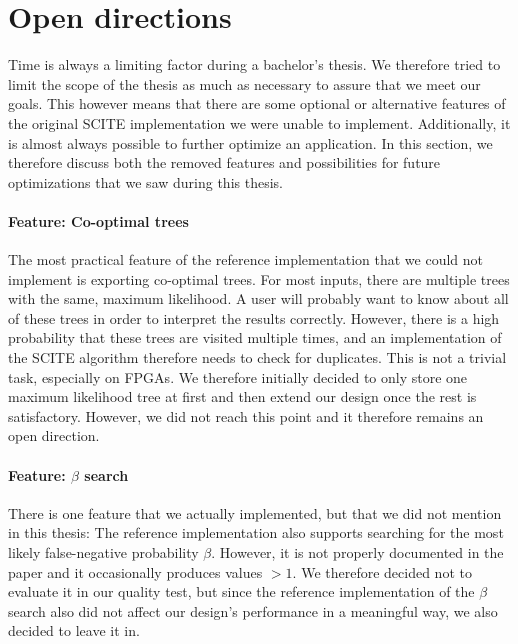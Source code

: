 \section{Open directions}
\label{sec:open_directions}

Time is always a limiting factor during a bachelor's thesis. We therefore tried to limit the scope of the thesis as much as necessary to assure that we meet our goals. This however means that there are some optional or alternative features of the original \ac{SCITE} implementation we were unable to implement. Additionally, it is almost always possible to further optimize an application. In this section, we therefore discuss both the removed features and possibilities for future optimizations that we saw during this thesis.

\paragraph{Feature: Co-optimal trees}
The most practical feature of the reference implementation that we could not implement is exporting co-optimal trees. For most inputs, there are multiple trees with the same, maximum likelihood. A user will probably want to know about all of these trees in order to interpret the results correctly. However, there is a high probability that these trees are visited multiple times, and an implementation of the \ac{SCITE} algorithm therefore needs to check for duplicates. This is not a trivial task, especially on \acp{FPGA}. We therefore initially decided to only store one maximum likelihood tree at first and then extend our design once the rest is satisfactory. However, we did not reach this point and it therefore remains an open direction.

\paragraph{Feature: $\beta$ search}
There is one feature that we actually implemented, but that we did not mention in this thesis: The reference implementation also supports searching for the most likely false-negative probability $\beta$. However, it is not properly documented in the paper and it occasionally produces values $>1$. We therefore decided not to evaluate it in our quality test, but since the reference implementation of the $\beta$ search also did not affect our design's performance in a meaningful way, we also decided to leave it in.

